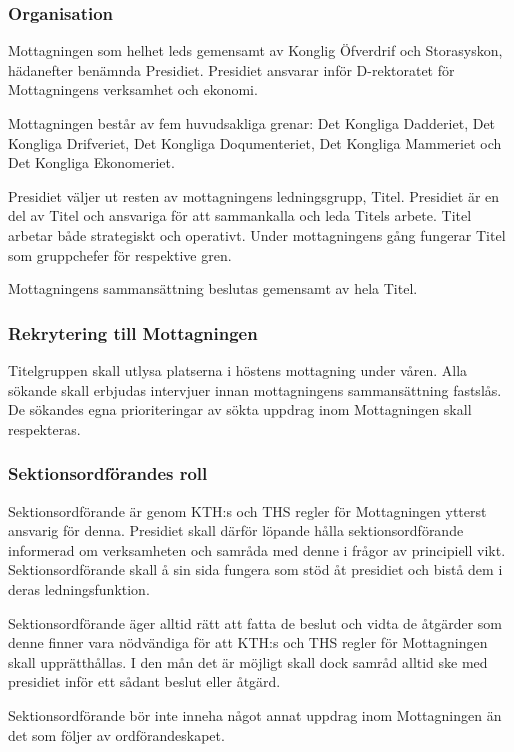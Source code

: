 \documentclass{dgovdoc}
\begin{document}
\subsubsection{Organisation}

Mottagningen som helhet leds gemensamt av Konglig Öfverdrif och Storasyskon, hädanefter 
benämnda Presidiet. Presidiet ansvarar inför D-rektoratet för Mottagningens verksamhet och ekonomi.

Mottagningen består av fem huvudsakliga grenar: Det Kongliga Dadderiet, Det Kongliga Drifveriet, Det Kongliga Doqumenteriet, Det Kongliga Mammeriet och Det Kongliga Ekonomeriet.

Presidiet väljer ut resten av mottagningens ledningsgrupp, Titel. Presidiet är en del av Titel och ansvariga för att sammankalla och leda Titels arbete. Titel arbetar både strategiskt och operativt. Under mottagningens gång fungerar Titel som gruppchefer för respektive gren.

Mottagningens sammansättning beslutas gemensamt av hela Titel.

\subsubsection{Rekrytering till Mottagningen}

Titelgruppen skall utlysa platserna i höstens mottagning under våren. Alla
sökande skall erbjudas intervjuer innan mottagningens sammansättning fastslås.
De sökandes egna prioriteringar av sökta uppdrag inom Mottagningen skall
respekteras.

\subsubsection{Sektionsordförandes roll}

Sektionsordförande är genom KTH:s och THS regler för Mottagningen ytterst
ansvarig för denna. Presidiet skall därför löpande hålla sektionsordförande
informerad om verksamheten och samråda med denne i frågor av principiell vikt.
Sektionsordförande skall å sin sida fungera som stöd åt presidiet och bistå dem
i deras ledningsfunktion.

Sektionsordförande äger alltid rätt att fatta de beslut och vidta de åtgärder
som denne finner vara nödvändiga för att KTH:s och THS regler för Mottagningen
skall upprätthållas. I den mån det är möjligt skall dock samråd alltid ske med
presidiet inför ett sådant beslut eller åtgärd.

Sektionsordförande bör inte inneha något annat uppdrag inom Mottagningen än det
som följer av ordförandeskapet.
\end{document}
